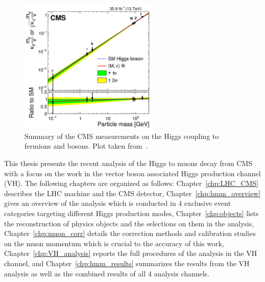 \begin{figure}[!htb]
    \centering
    \captionsetup{justification=justified}
    \includegraphics[width=0.60\textwidth]{pics/Intro/higgs_coupling_2016.png}
    \caption{Summary of the CMS measurements on the Higgs coupling to fermions and bosons.
             Plot taken from~\cite{Sirunyan:2640611}. }
    \label{fig:higgs_2016}
\end{figure}


This thesis presents the recent analysis of the Higgs to muons decay from CMS 
with a focus on the work in the vector boson associated Higgs production channel (VH).
The following chapters are organized as follows:
Chapter~\ref{chp:LHC_CMS} describes the LHC machine and the CMS detector,
Chapter~\ref{chp:hmm_overview} gives an overview of the \hmm analysis 
which is conducted in 4 exclusive event categories targeting different Higgs production modes,
Chapter~\ref{chp:objects} lists the reconstruction of physics objects and the selections on them in the analysis,
Chapter~\ref{chp:muon_corr} details the correction methods and calibration studies on the muon momentum which is crucial to the accuracy of this work,
Chapter~\ref{chp:VH_analysis} reports the full procedures of the analysis in the VH channel,
and Chapter~\ref{chp:hmm_results} summarizes the results from the VH analysis 
as well as the combined results of all 4 analysis channels. 